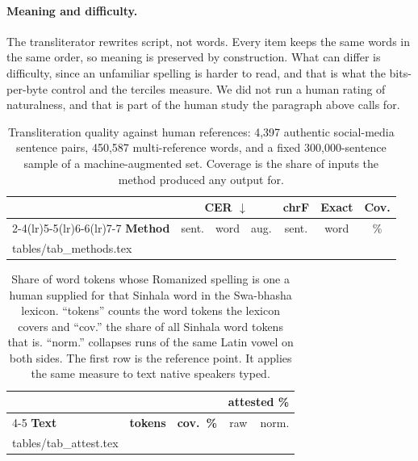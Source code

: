 \documentclass{article}
\makeatletter
\newcommand{\rows}[1]{\@@input #1 }
\makeatother
\begin{document}
\paragraph{Meaning and difficulty.} The transliterator rewrites script, not words. Every
item keeps the same words in the same order, so meaning is preserved by construction. What
can differ is difficulty, since an unfamiliar spelling is harder to read, and that is what
the bits-per-byte control and the terciles measure. We did not run a human rating of
naturalness, and that is part of the human study the paragraph above calls for.

\begin{table}[t]
\caption{Transliteration quality against human references: 4{,}397 authentic
social-media sentence pairs, 450{,}587 multi-reference words, and a fixed
300{,}000-sentence sample of a machine-augmented set. Coverage is the share of inputs
the method produced any output for.}
\label{tab:methods}
\centering\small
\setlength{\tabcolsep}{2.2pt}
\begin{tabular}{@{}lccccc c@{}}
\toprule
& \multicolumn{3}{c}{\textbf{CER} $\downarrow$} & \textbf{chrF} & \textbf{Exact} & \textbf{Cov.} \\
\cmidrule(lr){2-4}\cmidrule(lr){5-5}\cmidrule(lr){6-6}\cmidrule(lr){7-7}
\textbf{Method} & sent. & word & aug. & sent. & word & \% \\
\midrule
\rows{tables/tab_methods.tex}
\bottomrule
\end{tabular}
\end{table}

\begin{table}[t]
\caption{Share of word tokens whose Romanized spelling is one a human supplied for
that Sinhala word in the Swa-bhasha lexicon. ``tokens'' counts the word tokens the
lexicon covers and ``cov.'' the share of all Sinhala word tokens that is. ``norm.''
collapses runs of the same Latin vowel on both sides. The first row is the reference
point. It applies the same measure to text native speakers typed.}
\label{tab:attest}
\centering\footnotesize
\setlength{\tabcolsep}{2.4pt}
\begin{tabular}{@{}lrrrr@{}}
\toprule
& & & \multicolumn{2}{c}{\textbf{attested \%}} \\
\cmidrule(lr){4-5}
\textbf{Text} & \textbf{tokens} & \textbf{cov.\ \%} & raw & norm. \\
\midrule
\rows{tables/tab_attest.tex}
\bottomrule
\end{tabular}
\end{table}
\end{document}
